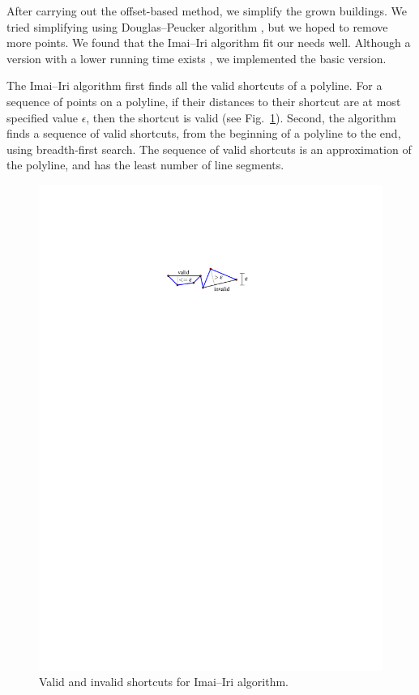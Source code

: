 \documentclass[graybox]{svmult}
\newcommand{\fig}{Fig.~}
\begin{document}
After carrying out the offset-based method, we simplify the grown buildings. 
We tried simplifying using Douglas--Peucker algorithm \parencite{Douglas1973}, 
but we hoped to remove more points. We found that the Imai--Iri 
algorithm \parencite{ImaiIri1988} fit our needs well. Although a version with a 
lower running time exists \parencite[see][]{Chan1992}, we implemented the basic 
version.

The Imai--Iri algorithm first finds all the valid shortcuts of a polyline.
For a sequence of points on a polyline, 
if their distances to their shortcut are 
at most specified value $\epsilon$, then the shortcut is valid (see 
\fig\ref{fig:ImaiIri_Shortcut}). 
Second, the algorithm finds a sequence of valid shortcuts, from the beginning 
of a polyline to the end, using breadth-first search.
The sequence of valid shortcuts is an approximation of the polyline, 
and has the least number of line segments.

\begin{figure}[tb]
	\centering
	\includegraphics{ImaiIri_Shortcut}
	\caption{Valid and invalid shortcuts for Imai--Iri algorithm.}
	\label{fig:ImaiIri_Shortcut}
\end{figure}
\end{document}
